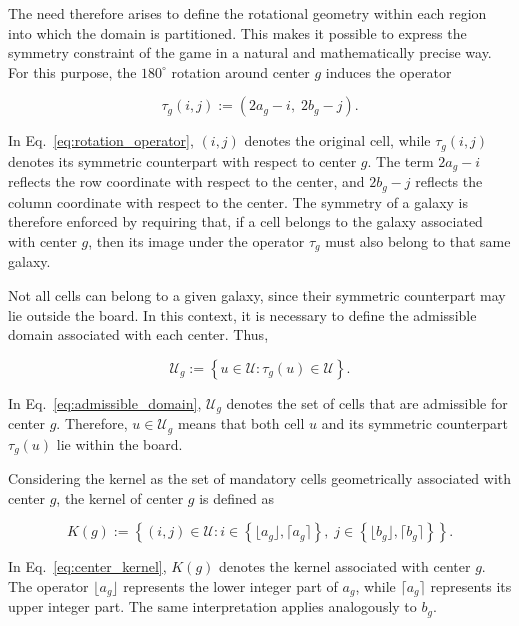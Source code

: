 The need therefore arises to define the rotational geometry within each region into which the domain is partitioned. This makes it possible to express the symmetry constraint of the game in a natural and mathematically precise way. For this purpose, the \(180^\circ\) rotation around center \(g\) induces the operator

\begin{equation}
\tau_g(i,j) := \left(2a_g - i,\; 2b_g - j\right).
\label{eq:rotation_operator}
\end{equation}

In Eq.~\ref{eq:rotation_operator}, \((i,j)\) denotes the original cell, while \(\tau_g(i,j)\) denotes its symmetric counterpart with respect to center \(g\). The term \(2a_g-i\) reflects the row coordinate with respect to the center, and \(2b_g-j\) reflects the column coordinate with respect to the center. The symmetry of a galaxy is therefore enforced by requiring that, if a cell belongs to the galaxy associated with center \(g\), then its image under the operator \(\tau_g\) must also belong to that same galaxy.

Not all cells can belong to a given galaxy, since their symmetric counterpart may lie outside the board. In this context, it is necessary to define the admissible domain associated with each center. Thus,

\begin{equation}
\mathcal{U}_g := \left\{ u \in \mathcal{U} : \tau_g(u) \in \mathcal{U} \right\}.
\label{eq:admissible_domain}
\end{equation}

In Eq.~\ref{eq:admissible_domain}, \(\mathcal{U}_g\) denotes the set of cells that are admissible for center \(g\). Therefore, \(u \in \mathcal{U}_g\) means that both cell \(u\) and its symmetric counterpart \(\tau_g(u)\) lie within the board.

Considering the kernel as the set of mandatory cells geometrically associated with center \(g\), the kernel of center \(g\) is defined as

\begin{equation}
K(g) :=
\left\{
(i,j) \in \mathcal{U} :
i \in \left\{\lfloor a_g \rfloor, \lceil a_g \rceil\right\},
\;
j \in \left\{\lfloor b_g \rfloor, \lceil b_g \rceil\right\}
\right\}.
\label{eq:center_kernel}
\end{equation}

In Eq.~\ref{eq:center_kernel}, \(K(g)\) denotes the kernel associated with center \(g\). The operator \(\lfloor a_g \rfloor\) represents the lower integer part of \(a_g\), while \(\lceil a_g \rceil\) represents its upper integer part. The same interpretation applies analogously to \(b_g\).

